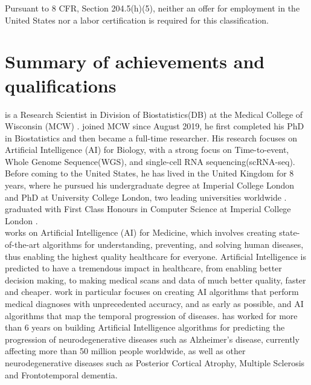 \documentclass[11pt]{article}
\begin{document}
Pursuant to 8 CFR, Section 204.5(h)(5), neither an offer for employment in the United States nor a labor certification is required for this classification.



\section{Summary of \drs achievements and qualifications}

\dr is a Research Scientist in Division of Biostatistics(DB) at the Medical College of Wisconsin (MCW) \cite{mcwoffer}. \dr joined MCW since August 2019, he first completed his PhD in Biostatistics and then became a full-time researcher. His research focuses on Artificial Intelligence (AI) for Biology, with a strong focus on Time-to-event, Whole Genome Sequence(WGS), and single-cell RNA sequencing(scRNA-seq). Before coming to the United States, he has lived in the United Kingdom for 8 years, where he pursued his undergraduate degree at Imperial College London and PhD at University College London, two leading universities worldwide \cite{cv} \cite{degrees}. \dr graduated with First Class Honours in Computer Science at Imperial College London \cite{degrees}.\\

\dr works on Artificial Intelligence (AI) for Medicine, which involves creating state-of-the-art algorithms for understanding, preventing, and solving human diseases, thus enabling the highest quality healthcare for everyone. Artificial Intelligence is predicted to have a tremendous impact in healthcare, from enabling better decision making, to making medical scans and data of much better quality, faster and cheaper. \drs work in particular focuses on creating AI algorithms that perform medical diagnoses with unprecedented accuracy, and as early as possible, and AI algorithms that map the temporal progression of diseases. \dr has worked for more than 6 years on building Artificial Intelligence algorithms for predicting the progression of neurodegenerative diseases such as Alzheimer's disease, currently affecting more than 50 million people worldwide, as well as other neurodegenerative diseases such as Posterior Cortical Atrophy, Multiple Sclerosis and Frontotemporal dementia. \\

\end{document}
